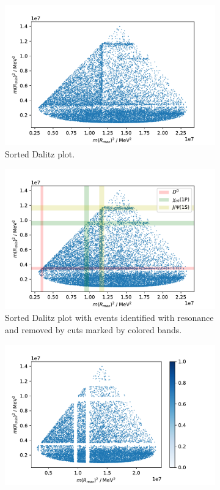 \begin{figure}[H]
  \centering
  \begin{subfigure}{0.49\textwidth}
    \includegraphics[width=\textwidth]{plots/Dalitz_sorted_scatter.pdf}
    \caption{Sorted Dalitz plot.}
    \label{f6a}
  \end{subfigure}
  \begin{subfigure}{0.49\textwidth}
    \includegraphics[width=\textwidth]{plots/Dalitz_sorted_scatter_band.pdf}
    \caption{Sorted Dalitz plot with events identified with resonance and removed by cuts marked by colored bands.}
    \label{f6b}
  \end{subfigure}
  \begin{subfigure}{0.49\textwidth}
    \includegraphics[width=\textwidth]{plots/Dalitz_sorted_scatter_cut.pdf}

\end{subfigure}
\end{figure}
